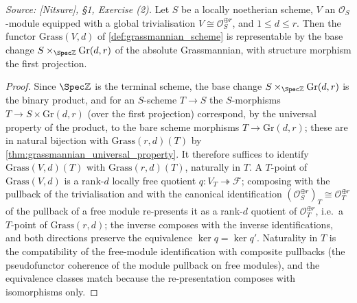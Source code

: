 \begin{lemma}
  \label{lem:grassmannian_representable_free}
  \textit{Source: [Nitsure], \S 1, Exercise (2).}
  Let \(S\) be a locally noetherian scheme, \(V\) an \(\mathcal{O}_S\)-module
  equipped with a global trivialisation \(V \cong \mathcal{O}_S^{\oplus r}\),
  and \(1 \le d \le r\). Then the functor \(\mathrm{Grass}(V, d)\) of
  \cref{def:grassmannian_scheme} is representable by the base change
  \(S \times_{\Spec \mathbb{Z}} \mathrm{Gr}(d,r)\) of the absolute
  Grassmannian, with structure morphism the first projection.
\end{lemma}

\begin{proof}\leanok
  Since \(\Spec \mathbb{Z}\) is the terminal scheme, the base change
  \(S \times_{\Spec\mathbb{Z}} \mathrm{Gr}(d,r)\) is the binary product, and
  for an \(S\)-scheme \(T \to S\) the \(S\)-morphisms
  \(T \to S \times \mathrm{Gr}(d,r)\) (over the first projection) correspond,
  by the universal property of the product, to the bare scheme morphisms
  \(T \to \mathrm{Gr}(d,r)\); these are in natural bijection with
  \(\mathrm{Grass}(r,d)(T)\) by \cref{thm:grassmannian_universal_property}.
  It therefore suffices to identify \(\mathrm{Grass}(V,d)(T)\) with
  \(\mathrm{Grass}(r,d)(T)\), naturally in \(T\).  A \(T\)-point of
  \(\mathrm{Grass}(V,d)\) is a rank-\(d\) locally free quotient
  \(q : V_T \twoheadrightarrow \mathcal{F}\); composing with the pullback of
  the trivialisation and with the canonical identification
  \((\mathcal{O}_S^{\oplus r})_T \cong \mathcal{O}_T^{\oplus r}\) of the
  pullback of a free module re-presents it as a rank-\(d\) quotient of
  \(\mathcal{O}_T^{\oplus r}\), i.e.\ a \(T\)-point of
  \(\mathrm{Grass}(r,d)\); the inverse composes with the inverse
  identifications, and both directions preserve the equivalence
  \(\ker q = \ker q'\).  Naturality in \(T\) is the compatibility of the
  free-module identification with composite pullbacks (the pseudofunctor
  coherence of the module pullback on free modules), and the equivalence
  classes match because the re-presentation composes with isomorphisms only.
\end{proof}


